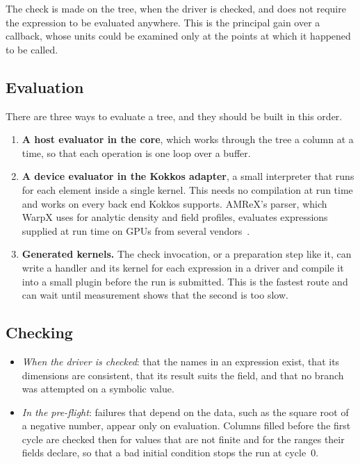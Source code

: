 \documentclass[11pt,a4paper]{article}
\begin{document}
The check is made on the tree, when the driver is checked, and does not
require the expression to be evaluated anywhere.  This is the principal
gain over a callback, whose units could be examined only at the points at
which it happened to be called.

\subsection{Evaluation}

There are three ways to evaluate a tree, and they should be built in this
order.

\begin{enumerate}
  \item \textbf{A host evaluator in the core}, which works through the tree
        a column at a time, so that each operation is one loop over a
        buffer.
  \item \textbf{A device evaluator in the Kokkos adapter}, a small
        interpreter that runs for each element inside a single kernel.
        This needs no compilation at run time and works on every back end
        Kokkos supports.  AMReX's parser, which WarpX uses for analytic
        density and field profiles, evaluates expressions supplied at run
        time on GPUs from several vendors~\cite{amrexparser,warpxparams}.
  \item \textbf{Generated kernels.}  The check invocation, or a preparation
        step like it, can write a handler and its kernel for each expression in a driver
        and compile it into a small plugin before the run is submitted.
        This is the fastest route and can wait until measurement shows that
        the second is too slow.
\end{enumerate}

\subsection{Checking}

\begin{itemize}
  \item \emph{When the driver is checked}: that the names in an expression
        exist, that its dimensions are consistent, that its result suits
        the field, and that no branch was attempted on a symbolic value.
  \item \emph{In the pre-flight}: failures that depend on the data, such as
        the square root of a negative number, appear only on evaluation.
        Columns filled before the first cycle are checked then for values
        that are not finite and for the ranges their fields declare, so
        that a bad initial condition stops the run at cycle~0.
\end{itemize}
\end{document}
